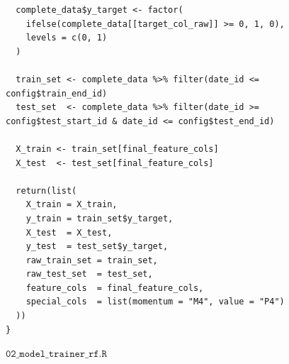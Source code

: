 \documentclass[11pt, a4paper]{article}
\begin{document}
\begin{verbatim}
  complete_data$y_target <- factor(
    ifelse(complete_data[[target_col_raw]] >= 0, 1, 0), 
    levels = c(0, 1)
  )
  
  train_set <- complete_data %>% filter(date_id <= config$train_end_id)
  test_set  <- complete_data %>% filter(date_id >= config$test_start_id & date_id <= config$test_end_id)
  
  X_train <- train_set[final_feature_cols]
  X_test  <- test_set[final_feature_cols]
  
  return(list(
    X_train = X_train,
    y_train = train_set$y_target,
    X_test  = X_test,
    y_test  = test_set$y_target,
    raw_train_set = train_set,
    raw_test_set  = test_set,
    feature_cols  = final_feature_cols,
    special_cols  = list(momentum = "M4", value = "P4")
  ))
}
\end{verbatim}
$\texttt{02\_model\_trainer\_rf.R}$
\end{document}
